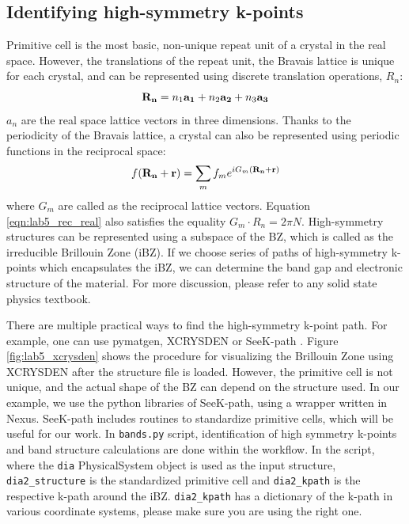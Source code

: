 \subsection{Identifying high-symmetry k-points}\label{sec:lab5_highk}
Primitive cell is the most basic, non-unique repeat unit of a crystal in the real space. 
However, the translations of the repeat unit, the Bravais lattice is unique for each crystal, and can be represented using discrete translation operations, $R_n$:
\begin{equation}
{\bf R_n} = n_1{\bf a_1} + n_2{\bf a_2} + n_3{\bf a_3}
\end{equation}
$a_n$ are the real space lattice vectors in three dimensions. Thanks to the periodicity of the Bravais lattice, a crystal can also be represented using periodic functions in the reciprocal space:
\begin{equation}
f({\bf R_n + r})= \sum_{m}f_me^{iG_m({\bf R_n+r})}\label{eqn:lab5_rec_real}
\end{equation}
where $G_m$ are called as the reciprocal lattice vectors. Equation \ref{eqn:lab5_rec_real} also satisfies the equality $G_m\cdot{R_n}=2{\pi}N$. High-symmetry structures can be represented using a subspace of the BZ, which is called as the irreducible Brillouin Zone (iBZ). If we choose series of  paths of high-symmetry k-points which encapsulates the iBZ, we can determine the band gap and electronic structure of the material. For more discussion, please refer to any solid state physics textbook. 

There are multiple practical ways to find the high-symmetry k-point path. 
For example, one can use pymatgen, \cite{Ong2013} XCRYSDEN \cite{Kokalj1999} or SeeK-path \cite{Hinuma2017}. 
Figure \ref{fig:lab5_xcrysden} shows the procedure for visualizing the Brillouin Zone using XCRYSDEN after the structure file is loaded. 
However, the primitive cell is not unique, and the actual shape of the BZ can depend on the structure used. 
In our example, we use the python libraries of SeeK-path, using a wrapper written in Nexus. 
SeeK-path includes routines to standardize primitive cells, which will be useful for our work. 
In \texttt{bands.py} script, identification of high symmetry k-points and band structure calculations are done within the workflow. 
In the script, where the \texttt{dia} PhysicalSystem object is used as the input structure, \texttt{dia2\_structure} is the standardized primitive cell and \texttt{dia2\_kpath} is the respective k-path around the iBZ. 
\texttt{dia2\_kpath} has a dictionary of the k-path in various coordinate systems, please make sure you are using the right one. 

